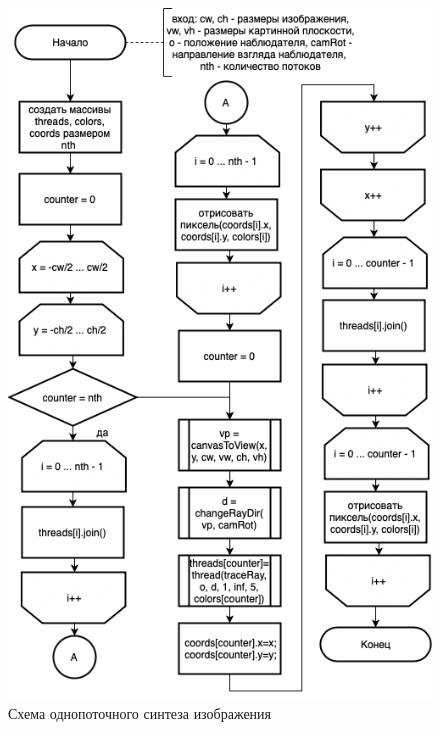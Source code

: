 \documentclass[12pt]{report}
\begin{document}
\begin{figure}[h!p]
	\centering
	\includegraphics[scale = 0.75]{multi.drawio.png}
	\caption{Схема однопоточного синтеза изображения}
	\label{fig:multi}
\end{figure}
\end{document}
